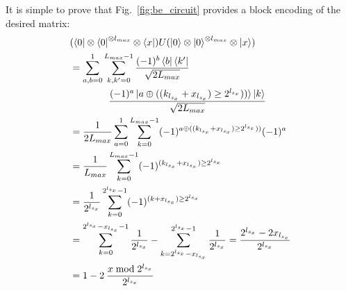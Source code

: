 It is simple to prove that Fig.~\ref{fig:be_circuit} provides a block encoding of the desired matrix:
\begin{align}
&(\bra{0}\otimes\bra{0}^{\otimes l_{max}}\otimes\bra{x}) U (\ket{0}\otimes\ket{0}^{\otimes l_{max}}\otimes\ket{x}) \\
&= \sum_{a,b=0}^1\sum_{k,k'=0}^{L_{max}-1} \frac{(-1)^b \bra{b}\bra{k'}}{\sqrt{2L_{max}}} \\
& \qquad\qquad \frac{(-1)^{a}\ket{a \oplus ((k_{l_{s_x}}+x_{l_{s_x}})\ge 2^{l_{s_x}}))}\ket{k}}{\sqrt{2L_{max}}}\\
&=  \frac{1}{2L_{max}}\sum_{a=0}^1\sum_{k=0}^{L_{max}-1} (-1)^{a \oplus ((k_{l_{s_x}}+x_{l_{s_x}})\ge 2^{l_{s_x}}))} (-1)^a\\
&= \frac{1}{L_{max}}\sum_{k=0}^{L_{max}-1}  (-1)^{(k_{l_{s_x}}+x_{l_{s_x}})\ge 2^{l_{s_x}}}\\
&= \frac{1}{2^{l_{s_x}}}\sum_{k=0}^{2^{l_{s_x}}-1} (-1)^{(k+x_{l_{s_x}})\ge 2^{l_{s_x}}} \\
&= \sum_{k=0}^{2^{l_{s_x}}-x_{l_{s_x}}-1} \frac{1}{2^{l_{s_x}}}-\sum_{k=2^{l_{s_x}}-x_{l_{s_x}}}^{2^{l_{s_x}}-1} \frac{1}{2^{l_{s_x}}} = \frac{2^{l_{s_x}}-2x_{l_{s_x}}}{2^{l_{s_x}}}\\
&= 1 - 2\>\frac{x \bmod 2^{l_{s_x}}}{2^{l_{s_x}}}
\end{align}

